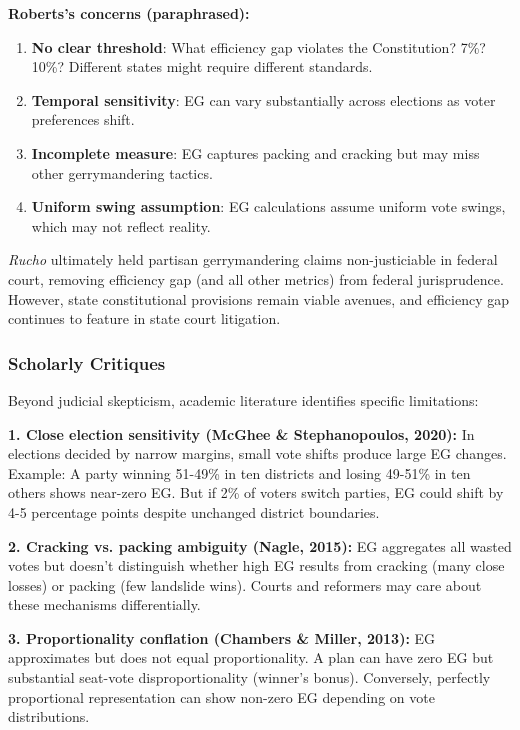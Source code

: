 \textbf{Roberts's concerns (paraphrased):}
\begin{enumerate}
    \item \textbf{No clear threshold}: What efficiency gap violates the Constitution? 7\%? 10\%? Different states might require different standards.
    \item \textbf{Temporal sensitivity}: EG can vary substantially across elections as voter preferences shift.
    \item \textbf{Incomplete measure}: EG captures packing and cracking but may miss other gerrymandering tactics.
    \item \textbf{Uniform swing assumption}: EG calculations assume uniform vote swings, which may not reflect reality.
\end{enumerate}

\emph{Rucho} ultimately held partisan gerrymandering claims non-justiciable in federal court, removing efficiency gap (and all other metrics) from federal jurisprudence. However, state constitutional provisions remain viable avenues, and efficiency gap continues to feature in state court litigation.

\subsubsection{Scholarly Critiques}

Beyond judicial skepticism, academic literature identifies specific limitations:

\textbf{1. Close election sensitivity (McGhee \& Stephanopoulos, 2020):}
In elections decided by narrow margins, small vote shifts produce large EG changes. Example: A party winning 51-49\% in ten districts and losing 49-51\% in ten others shows near-zero EG. But if 2\% of voters switch parties, EG could shift by 4-5 percentage points despite unchanged district boundaries.

\textbf{2. Cracking vs. packing ambiguity (Nagle, 2015):}
EG aggregates all wasted votes but doesn't distinguish whether high EG results from cracking (many close losses) or packing (few landslide wins). Courts and reformers may care about these mechanisms differentially.

\textbf{3. Proportionality conflation (Chambers \& Miller, 2013):}
EG approximates but does not equal proportionality. A plan can have zero EG but substantial seat-vote disproportionality (winner's bonus). Conversely, perfectly proportional representation can show non-zero EG depending on vote distributions.


